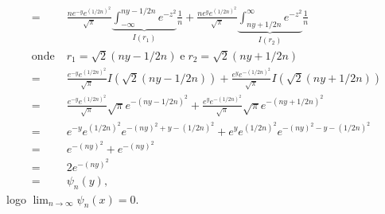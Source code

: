 \documentclass{article}
\begin{document}
\begin{enumerate}
\begin{enumerate}
$$\begin{aligned}
					= & \frac{ne^{-y}e^{(1/2n)^{2}}}{\sqrt{\pi}} \underbrace{ \int_{-\infty}^{ny-1/2n} e^{-z^{2}} }_{I(r_{1})} \frac{1}{n} + \frac{ne^{y}e^{ (1/2n)^{2}}}{\sqrt{\pi}}
					\underbrace{ \int_{ny+1/2n}^{\infty} e^{-z^{2}} }_{I(r_{2})} \frac{1}{n}
					\\
					\text{onde} \;& r_{1}=\sqrt{2}(ny-1/2n) \; \text{e} \; r_{2}=\sqrt{2}(ny+1/2n)
					\\
					= & \frac{e^{-y}e^{(1/2n)^{2}}}{\sqrt{\pi}} I(\sqrt{2}(ny-1/2n)) + \frac{e^{y}e^{ - (1/2n)^{2}}}{\sqrt{\pi}}I( \sqrt{2}(ny+1/2n))
					\\
					= & \frac{e^{-y}e^{(1/2n)^{2}}}{\sqrt{\pi}} \sqrt{\pi}e^{-(ny-1/2n)^{2}} + \frac{e^{y}e^{ - (1/2n)^{2}}}{\sqrt{\pi}} \sqrt{\pi} e^{-(ny+1/2n)^{2}}
					\\
					= & e^{-y}e^{(1/2n)^{2}} e^{-(ny)^{2}+y - (1/2n)^{2}}+ e^{y}e^{ (1/2n)^{2}}e^{-(ny)^{2}-y - (1/2n)^{2}}
					\\
					= &  e^{-(ny)^{2}}+ e^{-(ny)^{2}}
					\\
					= & 2e^{-(ny)^{2}}
					\\
					= & \psi_{n}(y),
					\end{aligned}
					$$
					logo $\lim_{n \to \infty} \psi_{n}(x) = 0$.
					

\end{enumerate}
\end{enumerate}
\end{document}
